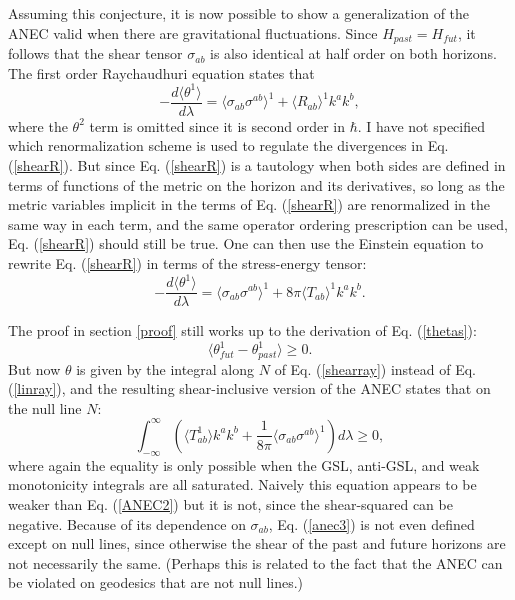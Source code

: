 \documentclass[11pt]{article}
\begin{document}
Assuming this conjecture, it is now possible to show a generalization of the ANEC valid when there are gravitational fluctuations.  Since $H_{past} = H_{fut}$, it follows that the shear tensor $\sigma_{ab}$ is also identical at half order on both horizons.  The first order Raychaudhuri equation states that
\begin{equation}\label{shearR}
-\frac{d \langle \theta^{1} \rangle}{d\lambda} = 
\langle \sigma_{ab}\sigma^{ab} \rangle^{1}
+ \langle R_{ab} \rangle^{1} k^a k^b,
\end{equation}
where the $\theta^2$ term is omitted since it is second order in $\hbar$.  I have not specified which renormalization scheme is used to regulate the divergences in Eq. (\ref{shearR}).  But since Eq. (\ref{shearR}) is a tautology when both sides are defined in terms of functions of the metric on the horizon and its derivatives, so long as the metric variables implicit in the terms of Eq. (\ref{shearR}) are renormalized in the same way in each term, and the same operator ordering prescription can be used, Eq. (\ref{shearR}) should still be true.  One can then use the Einstein equation to rewrite Eq. (\ref{shearR}) in terms of the stress-energy tensor:
\begin{equation}\label{shearray}
-\frac{d \langle \theta^{1} \rangle}{d\lambda} = 
\langle \sigma_{ab}\sigma^{ab} \rangle^{1}
+ 8\pi \langle T_{ab} \rangle^{1} k^a k^b.
\end{equation}

The proof in section \ref{proof} still works up to the derivation of Eq. (\ref{thetas}):
\begin{equation}
\langle \theta^{1}_{fut} - \theta^{1}_{past} \rangle \ge 0.
\end{equation}
But now $\theta$ is given by the integral along $N$ of Eq. (\ref{shearray}) instead of Eq. (\ref{linray}), and the resulting shear-inclusive version of the ANEC states that on the null line $N$:
\begin{equation}\label{anec3}
\int^{\infty}_{-\infty} (\langle T_{ab}^{1} \rangle k^a k^b + 
\frac{1}{8\pi} \langle \sigma_{ab}\sigma^{ab} \rangle^{1}) d\lambda \ge 0,
\end{equation}
where again the equality is only possible when the GSL, anti-GSL, and weak monotonicity integrals are all saturated.  Naively this equation appears to be weaker than Eq. (\ref{ANEC2}) but it is not, since the shear-squared can be negative.   Because of its dependence on $\sigma_{ab}$, Eq. (\ref{anec3}) is not even defined except on null lines, since otherwise the shear of the past and future horizons are not necessarily the same.  (Perhaps this is related to the fact that the ANEC can be violated on geodesics that are not null lines.)
\end{document}
